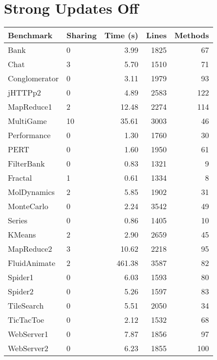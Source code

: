 \documentclass{article}
\begin{document}
\section{Strong Updates Off}
\begin{tabular}{|l|l|r|r|r|}
\hline
Benchmark & Sharing & Time (s) & Lines & Methods \\
\hline
Bank & 0 & 3.99 & 1825 & 67 \\
Chat & 3 & 5.70 & 1510 & 71 \\
Conglomerator & 0 & 3.11 & 1979 & 93 \\
jHTTPp2 & 0 & 4.89 & 2583 & 122 \\
MapReduce1 & 2 & 12.48 & 2274 & 114 \\
MultiGame & 10 & 35.61 & 3003 & 46 \\
Performance & 0 & 1.30 & 1760 & 30 \\
PERT & 0 & 1.60 & 1950 & 61 \\
FilterBank & 0 & 0.83 & 1321 & 9 \\
Fractal & 1 & 0.61 & 1334 & 8 \\
MolDynamics & 2 & 5.85 & 1902 & 31 \\
MonteCarlo & 0 & 2.24 & 3542 & 49 \\
Series & 0 & 0.86 & 1405 & 10 \\
KMeans & 2 & 2.90 & 2659 & 45 \\
MapReduce2 & 3 & 10.62 & 2218 & 95 \\
FluidAnimate & 2 & 461.38 & 3587 & 82 \\
Spider1 & 0 & 6.03 & 1593 & 80 \\
Spider2 & 0 & 5.26 & 1597 & 83 \\
TileSearch & 0 & 5.51 & 2050 & 34 \\
TicTacToe & 0 & 2.12 & 1532 & 68 \\
WebServer1 & 0 & 7.87 & 1856 & 97 \\
WebServer2 & 0 & 6.23 & 1855 & 100 \\
\hline
\end{tabular}
\end{document}
